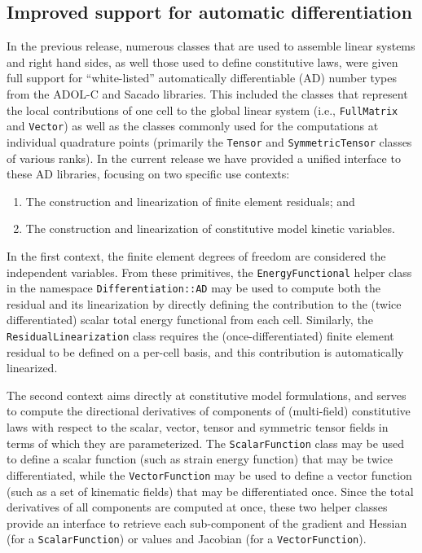 \documentclass{ansarticle-preprint}
\begin{document}
\subsection{Improved support for automatic differentiation}
\label{subsec:ad}

In the previous release, numerous classes that are used to assemble linear systems
and right hand sides, as well those used to define constitutive laws, were given
full support for ``white-listed'' automatically differentiable (AD) number types
from the ADOL-C and Sacado libraries. This included the classes that
represent the local contributions of one cell to the global linear
system (i.e., \texttt{FullMatrix} and \texttt{Vector}) as well as the
classes commonly used for the computations at individual quadrature
points (primarily the \texttt{Tensor} and \texttt{SymmetricTensor}
classes of various ranks).
In the current release we have provided a unified interface to these
AD libraries, focusing on two specific use contexts:
\begin{enumerate}
\item The construction and linearization of finite element residuals; and
\item The construction and linearization of constitutive model kinetic variables.
\end{enumerate}

In the first context, the finite element degrees of freedom are considered the
independent variables. From these primitives, the \texttt{EnergyFunctional} helper
class in the namespace \texttt{Differentiation::AD} may be used to compute both the
residual and its linearization by directly defining the contribution to the
(twice differentiated) scalar total energy functional from each cell. Similarly,
the \texttt{ResidualLinearization} class requires the (once-differentiated) finite
element residual to be defined on a per-cell basis,  and this contribution is
automatically linearized.

The second context aims directly at constitutive model formulations, and serves to
compute the directional derivatives of components of (multi-field) constitutive laws
with respect to the scalar, vector, tensor and symmetric tensor fields in terms
of which they are parameterized. The \texttt{ScalarFunction} class may be used to
define a scalar function (such as strain energy function) that may be twice
differentiated, while the \texttt{VectorFunction} may be used to define a vector
function (such as a set of kinematic fields) that may be differentiated once.
Since the total derivatives of all components are computed at once, these two helper
classes provide an interface to retrieve each sub-component of the gradient and
Hessian (for a \texttt{ScalarFunction}) or values and Jacobian (for a
\texttt{VectorFunction}).
\end{document}
